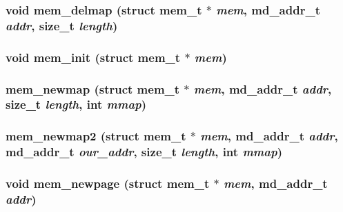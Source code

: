 \subsubsection[{mem\_\-delmap}]{\setlength{\rightskip}{0pt plus 5cm}void mem\_\-delmap (struct {\bf mem\_\-t} $\ast$ {\em mem}, \/  {\bf md\_\-addr\_\-t} {\em addr}, \/  size\_\-t {\em length})}\label{memory_8h_e2a684d4da3b80d59c91949af34cb01c}


\subsubsection[{mem\_\-init}]{\setlength{\rightskip}{0pt plus 5cm}void mem\_\-init (struct {\bf mem\_\-t} $\ast$ {\em mem})}\label{memory_8h_63f8f683dd1f4b2489d34984bd3422df}


\subsubsection[{mem\_\-newmap}]{ mem\_\-newmap (struct {\bf mem\_\-t} $\ast$ {\em mem}, \/  {\bf md\_\-addr\_\-t} {\em addr}, \/  size\_\-t {\em length}, \/  int {\em mmap})}\label{memory_8h_2a66417821c1ecf1c49c05a5b4f37cf1}


\subsubsection[{mem\_\-newmap2}]{ mem\_\-newmap2 (struct {\bf mem\_\-t} $\ast$ {\em mem}, \/  {\bf md\_\-addr\_\-t} {\em addr}, \/  {\bf md\_\-addr\_\-t} {\em our\_\-addr}, \/  size\_\-t {\em length}, \/  int {\em mmap})}\label{memory_8h_15d8a89dbc649d4d22ede41ad760a4f4}


\subsubsection[{mem\_\-newpage}]{\setlength{\rightskip}{0pt plus 5cm}void mem\_\-newpage (struct {\bf mem\_\-t} $\ast$ {\em mem}, \/  {\bf md\_\-addr\_\-t} {\em addr})}\label{memory_8h_ad0101398be2daf0d519855f60504b7f}


